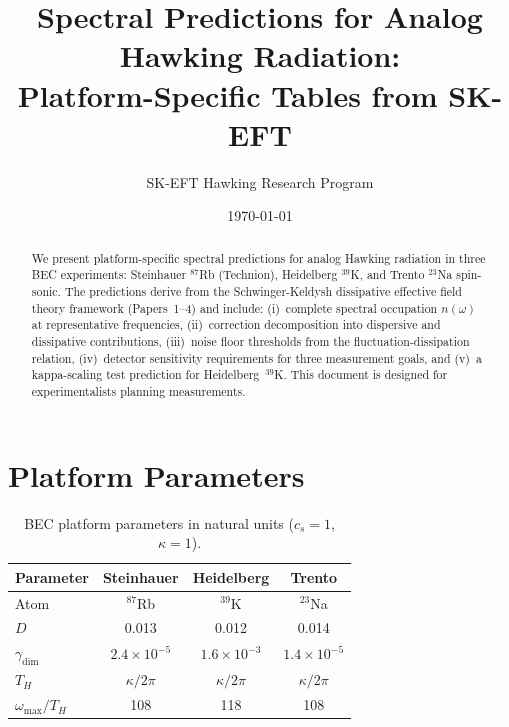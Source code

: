 \documentclass[aps,prd,twocolumn,showpacs,superscriptaddress,nofootinbib]{revtex4-2}
\begin{document}
\title{Spectral Predictions for Analog Hawking Radiation:\\
Platform-Specific Tables from SK-EFT}

\author{SK-EFT Hawking Research Program}

\date{\today}

\begin{abstract}
We present platform-specific spectral predictions for analog Hawking
radiation in three BEC experiments: Steinhauer $^{87}$Rb (Technion),
Heidelberg $^{39}$K, and Trento $^{23}$Na spin-sonic. The predictions
derive from the Schwinger-Keldysh dissipative effective field theory
framework (Papers~1--4) and include: (i)~complete spectral occupation
$n(\omega)$ at representative frequencies, (ii)~correction decomposition
into dispersive and dissipative contributions, (iii)~noise floor
thresholds from the fluctuation-dissipation relation, (iv)~detector
sensitivity requirements for three measurement goals, and
(v)~a kappa-scaling test prediction for Heidelberg~$^{39}$K.
This document is designed for experimentalists planning measurements.
\end{abstract}

\maketitle

\section{Platform Parameters}

\begin{table}[h]
\caption{BEC platform parameters in natural units ($c_s = 1$, $\kappa = 1$).}
\label{tab:params}
\begin{ruledtabular}
\begin{tabular}{lccc}
Parameter & Steinhauer & Heidelberg & Trento \\
\hline
Atom & $^{87}$Rb & $^{39}$K & $^{23}$Na \\
$D$ & 0.013 & 0.012 & 0.014 \\
$\gamma_\text{dim}$ & $2.4\times10^{-5}$ & $1.6\times10^{-3}$ & $1.4\times10^{-5}$ \\
$T_H$ & $\kappa/2\pi$ & $\kappa/2\pi$ & $\kappa/2\pi$ \\
$\omega_\text{max}/T_H$ & 108 & 118 & 108 \\
\end{tabular}
\end{ruledtabular}
\end{table}
\end{document}
